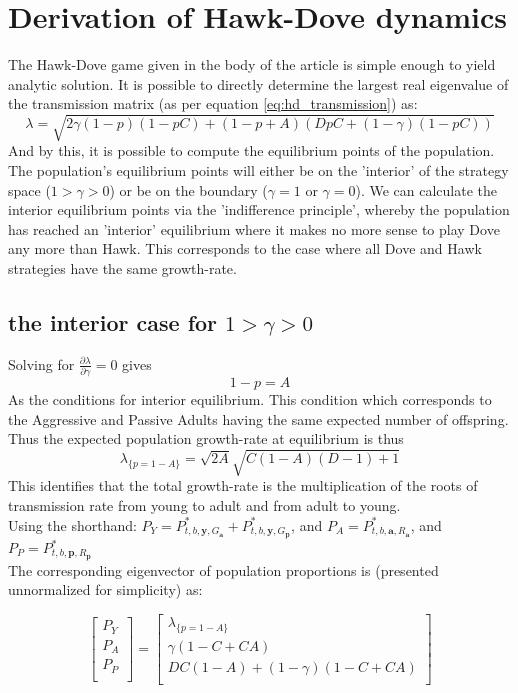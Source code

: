 \section{Derivation of Hawk-Dove dynamics}\label{appendix3}

The Hawk-Dove game given in the body of the article is simple enough to yield analytic solution.
It is possible to directly determine the largest real eigenvalue of the transmission matrix (as per equation \ref{eq:hd_transmission}) as: $$ \lambda = \sqrt{2\gamma(1-p)(1-pC)+(1-p+A)(DpC+(1-\gamma)(1-pC))} $$
And by this, it is possible to compute the equilibrium points of the population. The population's equilibrium points will either be on the 'interior' of the strategy space ($1>\gamma >0$) or be on the boundary ($\gamma=1$ or $\gamma=0$).
We can calculate the interior equilibrium points via the 'indifference principle'\cite{markov5}, whereby the population has reached an 'interior' equilibrium where it makes no more sense to play Dove any more than Hawk. This corresponds to the case where all Dove and Hawk strategies have the same growth-rate.

\subsection{the interior case for $1>\gamma >0$}

Solving for $\frac{\partial \lambda}{\partial \gamma}=0$ gives $$ 1-p=A $$ As the conditions for interior equilibrium.  This condition which corresponds to the Aggressive and Passive Adults having the same expected number of offspring.
Thus the expected population growth-rate at equilibrium is thus $$\lambda_{\{p=1-A\}} = \sqrt{2A}\sqrt{C(1-A)(D-1)+1}$$ This identifies that the total growth-rate is the multiplication of the roots of transmission rate from young to adult and from adult to young.\\
Using the shorthand: $P_Y=P^*_{t,b,\mathbf{y},G_{\mathbf{a}}}+P^*_{t,b,\mathbf{y},G_{\mathbf{p}}}$, and $P_A=P^*_{t,b,\mathbf{a},R_{\mathbf{a}}}$, and $P_P=P^*_{t,b,\mathbf{p},R_{\mathbf{p}}}$\\
The corresponding eigenvector of population proportions is (presented unnormalized for simplicity) as:

$$ \begin{bmatrix}
    P_Y \\
    P_A \\
    P_P \\
\end{bmatrix} = \begin{bmatrix}
    \lambda_{\{p=1-A\}} \\
    \gamma(1-C+CA) \\
    DC(1-A) + (1-\gamma)(1-C+CA) \\
\end{bmatrix} $$

